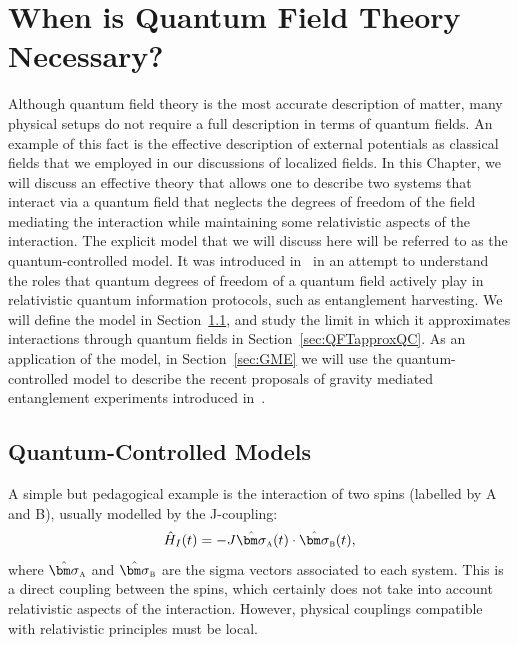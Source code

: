 \documentclass[letterpaper,12pt,titlepage,oneside,final]{book}
\newcommand{\tc}[1]{\textsc{#1}}
\begin{document}



\chapter{When is Quantum Field Theory Necessary?}\label{chap:qc}

    Although quantum field theory is the most accurate description of matter, many physical setups do not require a full description in terms of quantum fields. An example of this fact is the effective description of external potentials as classical fields that we employed in our discussions of localized fields. In this Chapter, we will discuss an effective theory that allows one to describe two systems that interact via a quantum field that neglects the degrees of freedom of the field mediating the interaction while maintaining some relativistic aspects of the interaction. The explicit model that we will discuss here will be referred to as the quantum-controlled model. It was introduced in~\cite{quantClass} in an attempt to understand the roles that quantum degrees of freedom of a quantum field actively play in relativistic quantum information protocols, such as entanglement harvesting. We will define the model in Section~\ref{sec:QCmodels}, and study the limit in which it approximates interactions through quantum fields in Section~\ref{sec:QFTapproxQC}. As an application of the model, in Section~\ref{sec:GME} we will use the quantum-controlled model to describe the recent proposals of gravity mediated entanglement experiments introduced in~\cite{B,MV}.

\section{Quantum-Controlled Models}\label{sec:QCmodels}

    A simple but pedagogical example is the interaction of two spins (labelled by A and B), usually modelled by the J-coupling:
    \begin{equation}\label{eq:Jcoupling}
        \hat{H}_I(t) = -J \hat{\bm \sigma}_\tc{a}(t)\cdot \hat{\bm \sigma}_\tc{b}(t),
    \end{equation}
    where $\hat{\bm \sigma}_\tc{a}$ and $\hat{\bm \sigma}_\tc{b}$ are the sigma vectors associated to each system. This is a direct coupling between the spins, which certainly does not take into account relativistic aspects of the interaction. However, physical couplings compatible with relativistic principles must be local. 
    
\end{document}

